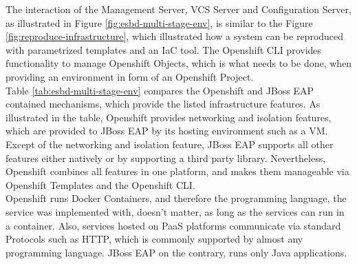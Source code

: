 The interaction of the Management Server, VCS Server and Configuration Server, as illustrated in Figure \vref{fig:esbd-multi-stage-env}, is similar to the Figure \vref{fig:reproduce-infrastructure}, which illustrated how a system can be reproduced with parametrized templates and an IaC tool. The Openshift CLI provides functionality to manage Openshift Objects, which is what needs to be done, when providing an environment in form of an Openshift Project.  \\

Table \vref{tab:esbd-multi-stage-env} compares the Openshift and JBoss EAP contained mechanisms, which provide the listed infrastructure features. As illustrated in the table, Openshift provides networking and isolation features, which are provided to JBoss EAP by its hosting environment such as a VM. Except of the networking and isolation feature, JBoss EAP supports all other features either natively or by supporting a third party library. Nevertheless, Openshift combines all features in one platform, and makes them manageable via Openshift Templates and the Openshift CLI. \\

Openshift runs Docker Containers, and therefore the programming language, the service was implemented with, doesn't matter, as long as the services can run in a container. Also, services hosted on PaaS platforms communicate via standard Protocols such as HTTP, which is commonly supported by almost any programming language. JBoss EAP on the contrary, runs only Java applications.
\newpage

